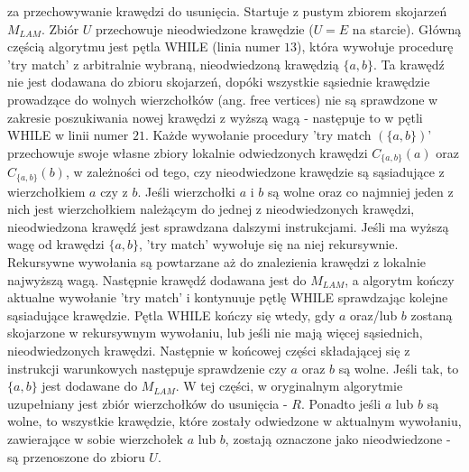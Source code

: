 za przechowywanie krawędzi do usunięcia.
Startuje z pustym zbiorem skojarzeń $M_{LAM}$.
Zbiór $U$ przechowuje nieodwiedzone krawędzie ($U = E$ na starcie).
Główną częścią algorytmu jest pętla WHILE (linia numer $13$), która wywołuje
procedurę 'try match' z arbitralnie wybraną, nieodwiedzoną krawędzią $\{a,b\}$.
Ta krawędź nie jest dodawana do
zbioru skojarzeń, dopóki wszystkie sąsiednie krawędzie prowadzące do wolnych wierzchołków (ang. free vertices) nie są sprawdzone
w zakresie poszukiwania nowej krawędzi z wyższą wagą - następuje to w pętli WHILE w linii numer $21$.
Każde wywołanie procedury 'try match $(\{a,b\})$' przechowuje swoje własne zbiory lokalnie odwiedzonych krawędzi
$C_{\{a,b\}}(a)$ oraz $C_{\{a,b\}}(b)$, w zależności od tego, czy nieodwiedzone krawędzie są sąsiadujące z wierzchołkiem
$a$ czy z $b$.
Jeśli wierzchołki $a$ i $b$ są wolne oraz co najmniej jeden z nich jest wierzchołkiem należącym do jednej z
nieodwiedzonych krawędzi, nieodwiedzona krawędź jest sprawdzana dalszymi instrukcjami.
Jeśli ma wyższą wagę od krawędzi $\{a,b\}$, 'try match' wywołuje się na niej rekursywnie.
Rekursywne wywołania są powtarzane aż do znalezienia krawędzi z lokalnie najwyższą wagą.
Następnie krawędź dodawana jest do $M_{LAM}$, a algorytm kończy aktualne wywołanie 'try match' i kontynuuje
pętlę WHILE sprawdzając kolejne sąsiadujące krawędzie.
Pętla WHILE kończy się wtedy, gdy $a$ oraz/lub $b$ zostaną skojarzone w rekursywnym wywołaniu, lub jeśli nie mają więcej
sąsiednich, nieodwiedzonych krawędzi. Następnie w końcowej części składającej się z instrukcji warunkowych
następuje sprawdzenie czy $a$ oraz $b$
są wolne. Jeśli tak, to $\{a,b\}$ jest dodawane do $M_{LAM}$.
W tej części, w oryginalnym algorytmie uzupełniany jest zbiór
wierzchołków do usunięcia \cite{weighted_maching} - $R$.
Ponadto jeśli $a$ lub $b$ są wolne, to wszystkie krawędzie, które zostały
odwiedzone w aktualnym wywołaniu, zawierające w sobie wierzchołek $a$ lub $b$, zostają oznaczone jako nieodwiedzone -
są przenoszone do zbioru $U$.

